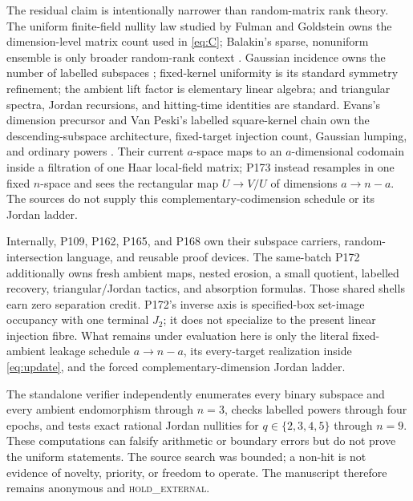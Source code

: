 \documentclass[a4paper,10pt]{amsart}
\theoremstyle{remark}
\begin{document}
The residual claim is intentionally narrower than random-matrix rank theory.
The uniform finite-field nullity law studied by Fulman and Goldstein owns the
dimension-level matrix count used in \eqref{eq:C}; Balakin's sparse,
nonuniform ensemble is only broader random-rank context
\cite{Balakin1968,FulmanGoldstein2015}.  Gaussian incidence owns the number
of labelled subspaces \cite{GoldmanRota1970}; fixed-kernel uniformity is its
standard symmetry refinement; the ambient lift factor is elementary linear
algebra; and triangular spectra, Jordan recursions, and hitting-time
identities are standard.  Evans's dimension precursor and Van Peski's
labelled square-kernel chain own the descending-subspace architecture,
fixed-target injection count, Gaussian lumping, and ordinary powers
\cite{Evans2002,VanPeski2018}.  Their current $a$-space maps to an
$a$-dimensional codomain inside a filtration of one Haar local-field matrix;
P173 instead resamples in one fixed $n$-space and sees the rectangular map
$U\to V/U$ of dimensions $a\to n-a$.  The sources do not supply this
complementary-codimension schedule or its Jordan ladder.

Internally, P109, P162, P165, and P168 own their subspace carriers,
random-intersection language, and reusable proof devices.  The same-batch
P172 additionally owns fresh ambient maps, nested erosion, a small quotient,
labelled recovery, triangular/Jordan tactics, and absorption formulas.
Those shared shells earn zero separation credit.  P172's inverse axis is
specified-box set-image occupancy with one terminal $J_2$; it does not
specialize to the present linear injection fibre.  What remains under
evaluation here is only the literal fixed-ambient leakage schedule
$a\to n-a$, its every-target realization inside \eqref{eq:update}, and the
forced complementary-dimension Jordan ladder.

The standalone verifier independently enumerates every binary subspace and
every ambient endomorphism through $n=3$, checks labelled powers through four
epochs, and tests exact rational Jordan nullities for
$q\in\{2,3,4,5\}$ through $n=9$.  These computations can falsify arithmetic
or boundary errors but do not prove the uniform statements.  The source
search was bounded; a non-hit is not evidence of novelty, priority, or
freedom to operate.  The manuscript therefore remains anonymous and
\textsc{hold\_external}.



\end{document}
